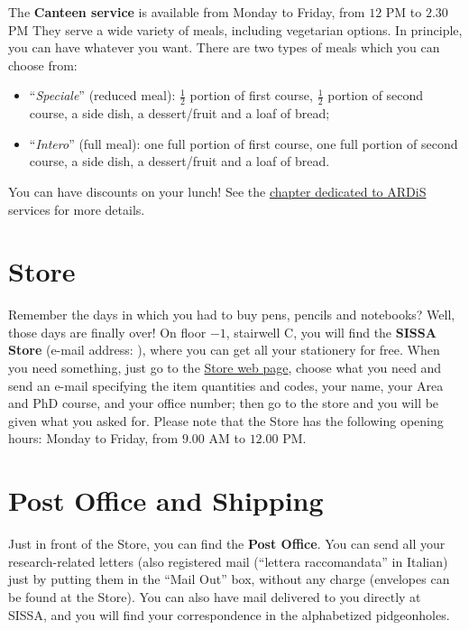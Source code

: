\documentclass{sissavademecum}
\begin{document}
The \textbf{Canteen service} is available from Monday to Friday, from $12$ PM to $2.30$ PM They serve a wide variety of meals, including vegetarian options. In principle, you can have whatever you want. There are two types of meals which you can choose from:

\begin{itemize}
    \item ``\textit{Speciale}'' (reduced meal): $\frac{1}{2}$ portion of first course, $\frac{1}{2}$ portion of second course, a side dish, a
    dessert/fruit and a loaf of bread;
    \item ``\textit{Intero}'' (full meal): one full portion of first course, one full portion of second course, a side
    dish, a dessert/fruit and a loaf of bread.
\end{itemize}

\noindent You can have discounts on your lunch! See the \hyperlink{ARDiS}{chapter dedicated to ARDiS} services for more details.


\section{Store}\label{sec:Store}

Remember the days in which you had to buy pens, pencils and notebooks? Well, those days are finally over! On floor $-1$, stairwell C, you will find the \textbf{SISSA Store} (e-mail address: ), where you can get all your stationery for free. When you need something, just go to the \href{http://services.sissa.it/store/}{Store web page}, choose what you need and send an e-mail specifying the item quantities and codes, your name, your Area and PhD course, and your office number; then go to the store and you will be given what you asked for. Please note that the Store has the following opening hours: Monday to Friday, from $9.00$ AM to $12.00$ PM.


\section{Post Office and Shipping}

Just in front of the Store, you can find the \textbf{Post Office}. You can send all your research-related letters (also registered mail (``lettera raccomandata'' in Italian) just by putting them in the ``Mail Out'' box, without any charge (envelopes can be found at the Store). You can also have mail delivered to you directly at SISSA, and you will find your correspondence in the alphabetized pidgeonholes.
\end{document}
